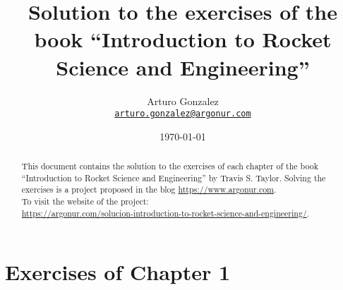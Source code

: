 \documentclass{article}
\begin{document}
\title{Solution to the exercises of the book ``Introduction to Rocket Science and Engineering''}
\author{Arturo Gonzalez\\
	\texttt{\href{mailto:arturo.gonzalez@argonur.com}{arturo.gonzalez@argonur.com}}}
\date{\today}
\maketitle

\begin{abstract}
This document contains the solution to the exercises of each chapter of the book ``Introduction to Rocket Science and Engineering'' by Travis S. Taylor. Solving the exercises is a project proposed in the blog \url{https://www.argonur.com}.\\
To visit the website of the project: \\
\url{https://argonur.com/solucion-introduction-to-rocket-science-and-engineering/}. 
\end{abstract}

\cleardoublepage


%

\section{Exercises of Chapter 1}
\end{document}
